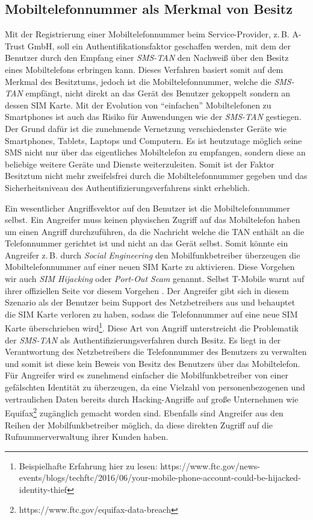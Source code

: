 \documentclass[11pt,a4paper,ngerman]{scrreprt}
\begin{document}
\subsection{Mobiltelefonnummer als Merkmal von Besitz}
Mit der Registrierung einer Mobiltelefonnummer beim Service-Provider, z.\,B. A-Trust GmbH, soll ein Authentifikationsfaktor geschaffen werden, mit dem der Benutzer durch den Empfang einer \textit{SMS-TAN} den Nachweiß über den Besitz eines Mobiltelefons erbringen kann. Dieses Verfahren basiert somit auf dem Merkmal des Besitztums, jedoch ist die Mobiltelefonnummer, welche die \textit{SMS-TAN} empfängt, nicht direkt an das Gerät des Benutzer gekoppelt sondern an dessen SIM Karte. Mit der Evolution von ``einfachen'' Mobiltelefonen zu Smartphones ist auch das Risiko für Anwendungen wie der \textit{SMS-TAN} gestiegen. Der Grund dafür ist die zunehmende Vernetzung verschiedenster Geräte wie Smartphones, Tablets, Laptops und Computern. Es ist heutzutage möglich seine SMS nicht nur über das eigentliches Mobiltelefon zu empfangen, sondern diese an beliebige weitere Geräte und Dienste weiterzuleiten. Somit ist der Faktor Besitztum nicht mehr zweifelsfrei durch die Mobiltelefonnummer gegeben und das Sicherheitsniveau des Authentifizierungsverfahrens sinkt erheblich.

Ein wesentlicher Angriffsvektor auf den Benutzer ist die Mobiltelefonnummer selbst. Ein Angreifer muss keinen physischen Zugriff auf das Mobiltelefon haben um einen Angriff durchzuführen, da die Nachricht welche die TAN enthält an die Telefonnummer gerichtet ist und nicht an das Gerät selbst. Somit könnte ein Angreifer z.\,B. durch \emph{Social Engineering} den Mobilfunkbetreiber überzeugen die Mobiltelefonnummer auf einer neuen SIM Karte zu aktivieren. Diese Vorgehen wir auch \emph{SIM Hijacking} oder \emph{Port-Out Scam} genannt. Selbst T-Mobile warnt auf ihrer offiziellen Seite vor diesem Vorgehen \cite{telekomPortOut}. Der Angreifer gibt sich in diesem Szenario als der Benutzer beim Support des Netzbetreibers aus und behauptet die SIM Karte verloren zu haben, sodass die Telefonnummer auf eine neue SIM Karte überschrieben wird\footnote{Beispielhafte Erfahrung hier zu lesen: https://www.ftc.gov/news-events/blogs/techftc/2016/06/your-mobile-phone-account-could-be-hijacked-identity-thief}. Diese Art von Angriff unterstreicht die Problematik der \textit{SMS-TAN} als Authentifizierungsverfahren durch Besitz. Es liegt in der Verantwortung des Netzbetreibers die Telefonnummer des Benutzers zu verwalten und somit ist diese kein Beweis von Besitz des Benutzers über das Mobiltelefon. Für Angreifer wird es zunehmend einfacher die Mobilfunkbetreiber von einer gefälschten Identität zu überzeugen, da eine Vielzahl von personenbezogenen und vertraulichen Daten bereits durch Hacking-Angriffe auf große Unternehmen wie Equifax\footnote{https://www.ftc.gov/equifax-data-breach} zugänglich gemacht worden sind. Ebenfalls sind Angreifer aus den Reihen der Mobilfunkbetreiber möglich, da diese direkten Zugriff auf die Rufnummerverwaltung ihrer Kunden haben.
\end{document}
